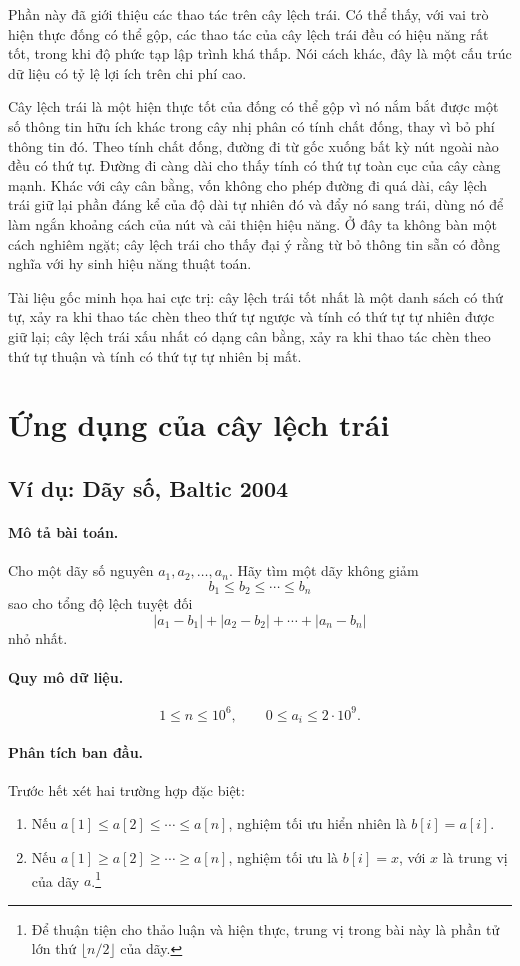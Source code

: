 \documentclass[11pt]{article}
\begin{document}
Phần này đã giới thiệu các thao tác trên cây lệch trái. Có thể thấy, với vai
trò hiện thực đống có thể gộp, các thao tác của cây lệch trái đều có hiệu năng
rất tốt, trong khi độ phức tạp lập trình khá thấp. Nói cách khác, đây là một
cấu trúc dữ liệu có tỷ lệ lợi ích trên chi phí cao.

Cây lệch trái là một hiện thực tốt của đống có thể gộp vì nó nắm bắt được một
số thông tin hữu ích khác trong cây nhị phân có tính chất đống, thay vì bỏ phí
thông tin đó. Theo tính chất đống, đường đi từ gốc xuống bất kỳ nút ngoài nào
đều có thứ tự. Đường đi càng dài cho thấy tính có thứ tự toàn cục của cây càng
mạnh. Khác với cây cân bằng, vốn không cho phép đường đi quá dài, cây lệch trái
giữ lại phần đáng kể của độ dài tự nhiên đó và đẩy nó sang trái, dùng nó để làm
ngắn khoảng cách của nút và cải thiện hiệu năng. Ở đây ta không bàn một cách
nghiêm ngặt; cây lệch trái cho thấy đại ý rằng từ bỏ thông tin sẵn có đồng nghĩa
với hy sinh hiệu năng thuật toán.

Tài liệu gốc minh họa hai cực trị: cây lệch trái tốt nhất là một danh sách có
thứ tự, xảy ra khi thao tác chèn theo thứ tự ngược và tính có thứ tự tự nhiên
được giữ lại; cây lệch trái xấu nhất có dạng cân bằng, xảy ra khi thao tác chèn
theo thứ tự thuận và tính có thứ tự tự nhiên bị mất.

\section{Ứng dụng của cây lệch trái}

\subsection{Ví dụ: Dãy số, Baltic 2004}

\paragraph{Mô tả bài toán.}
Cho một dãy số nguyên \(a_1,a_2,\ldots,a_n\). Hãy tìm một dãy không giảm
\[
  b_1\le b_2\le\cdots\le b_n
\]
sao cho tổng độ lệch tuyệt đối
\[
  |a_1-b_1|+|a_2-b_2|+\cdots+|a_n-b_n|
\]
nhỏ nhất.

\paragraph{Quy mô dữ liệu.}
\[
  1\le n\le 10^6,\qquad 0\le a_i\le 2\cdot 10^9.
\]

\paragraph{Phân tích ban đầu.}
Trước hết xét hai trường hợp đặc biệt:
\begin{enumerate}
  \item Nếu \(a[1]\le a[2]\le\cdots\le a[n]\), nghiệm tối ưu hiển nhiên là
  \(b[i]=a[i]\).
  \item Nếu \(a[1]\ge a[2]\ge\cdots\ge a[n]\), nghiệm tối ưu là \(b[i]=x\), với
  \(x\) là trung vị của dãy \(a\).\footnote{Để thuận tiện cho thảo luận và hiện
  thực, trung vị trong bài này là phần tử lớn thứ \(\lfloor n/2\rfloor\) của
  dãy.}
\end{enumerate}
\end{document}

